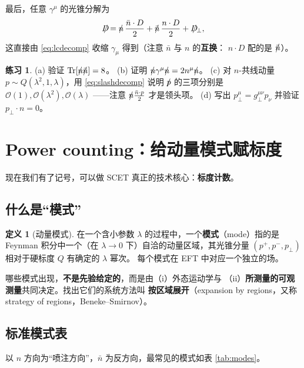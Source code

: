 \documentclass[UTF8,a4paper,11pt]{ctexart}
\theoremstyle{definition}
\newtheorem{definition}{定义}[section]
\newtheorem{exercise}{练习}[section]
\theoremstyle{remark}
\theoremstyle{plain}
\newcommand{\nsl}{n\mkern-10.5mu/\mkern1.5mu}
\newcommand{\nbsl}{\bar{n}\mkern-10.5mu/\mkern1.5mu}
\newcommand{\Dsl}{D\mkern-11.5mu/}
\newcommand{\psl}{p\mkern-9.5mu/}
\newcommand{\en}[1]{\textsf{#1}}   %
\newcommand{\Tr}{\mathrm{Tr}}
\begin{document}
最后，任意 $\gamma^\mu$ 的光锥分解为
\begin{equation}
  \Dsl=\nsl\,\frac{\bar n\cdot D}{2}+\nbsl\,\frac{n\cdot D}{2}+\Dsl_\perp ,
  \label{eq:slashdecomp}
\end{equation}
这直接由 \eqref{eq:lcdecomp} 收缩 $\gamma_\mu$ 得到（注意 $\bar n$ 与 $n$ 的\textbf{互换}：
$n\cdot D$ 配的是 $\nbsl$）。

\begin{exercise}
\label{ex:lc}
(a) 验证 $\Tr[\nsl\nbsl]=8$。
(b) 证明 $\nsl\gamma^\mu\nsl=2n^\mu\nsl$。
(c) 对 $n$-共线动量 $p\sim Q(\lambda^2,1,\lambda)$，用 \eqref{eq:slashdecomp}
    说明 $\psl$ 的三项分别是 $\mathcal O(1),\mathcal O(\lambda^2),\mathcal O(\lambda)$
    ——注意 $\nsl\frac{\bar n\cdot p}{2}$ 才是领头项。
(d) 写出 $p_\perp^\mu=g_\perp^{\mu\nu}p_\nu$ 并验证 $p_\perp\cdot n=0$。
\end{exercise}

\section{Power counting：给动量模式赋标度}
\label{sec:powercounting}

现在我们有了记号，可以做 SCET 真正的技术核心：\textbf{标度计数}。

\subsection{什么是“模式”}

\begin{definition}[动量模式]
在一个含小参数 $\lambda$ 的过程中，一个\textbf{模式}（\en{mode}）指的是
Feynman 积分中一个（在 $\lambda\to0$ 下）自洽的动量区域，其光锥分量
$(p^+,p^-,p_\perp)$ 相对于硬标度 $Q$ 有确定的 $\lambda$ 幂次。
每个模式在 EFT 中对应一个独立的场。
\end{definition}

哪些模式出现，\textbf{不是先验给定的}，而是由（i）外态运动学与
（ii）\textbf{所测量的可观测量}共同决定。找出它们的系统方法叫
\textbf{按区域展开}（\en{expansion by regions}，又称
\en{strategy of regions}，Beneke--Smirnov）。

\subsection{标准模式表}
\label{subsec:modetable}

以 $n$ 方向为“喷注方向”，$\bar n$ 为反方向，最常见的模式如表 \ref{tab:modes}。
\end{document}
